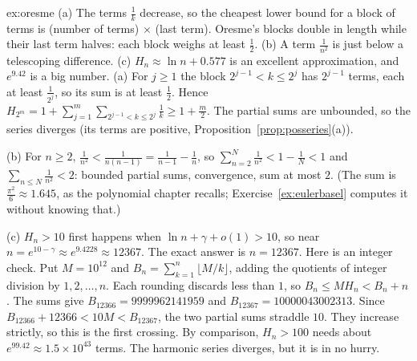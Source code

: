 \begin{solution}{ex:oresme}
\idea (a) The terms $\frac1k$ decrease, so the cheapest lower bound for a block of terms is (number of terms) $\times$ (last term). Oresme's blocks double in length while their last term halves: each block weighs at least $\frac12$. (b) A term $\frac1{n^2}$ is just below a telescoping difference. (c) $H_n\approx\ln n+0.577$ is an excellent approximation, and $e^{9.42}$ is a big number.
\writeup (a) For $j\ge1$ the block $2^{j-1}<k\le2^j$ has $2^{j-1}$ terms, each at least $\frac1{2^j}$, so its sum is at least $\frac12$. Hence
$H_{2^m}=1+\sum_{j=1}^m\sum_{2^{j-1}<k\le2^j}\frac1k\ge1+\frac m2$. The partial sums are unbounded, so the series diverges (its terms are positive, Proposition~\ref{prop:posseries}(a)).

(b) For $n\ge2$, $\frac1{n^2}<\frac1{n(n-1)}=\frac1{n-1}-\frac1n$, so $\sum_{n=2}^N\frac1{n^2}<1-\frac1N<1$ and $\sum_{n\le N}\frac1{n^2}<2$: bounded partial sums, convergence, sum at most $2$. (The sum is $\frac{\pi^2}6\approx1.645$, as the polynomial chapter recalls; Exercise~\ref{ex:eulerbasel} computes it without knowing that.)

(c) $H_n>10$ first happens when $\ln n+\gamma+o(1)>10$, so near $n=e^{10-\gamma}\approx e^{9.4228}\approx12367$. The exact answer is $n=12367$. Here is an integer check. Put $M=10^{12}$ and $B_n=\sum_{k=1}^n\lfloor M/k\rfloor$, adding the quotients of integer division by $1,2,\ldots,n$. Each rounding discards less than $1$, so $B_n\le M H_n<B_n+n$. The sums give $B_{12366}=9999962141959$ and $B_{12367}=10000043002313$. Since $B_{12366}+12366<10M<B_{12367}$, the two partial sums straddle $10$. They increase strictly, so this is the first crossing. By comparison, $H_n>100$ needs about $e^{99.42}\approx1.5\times10^{43}$ terms. The harmonic series diverges, but it is in no hurry.
\end{solution}

